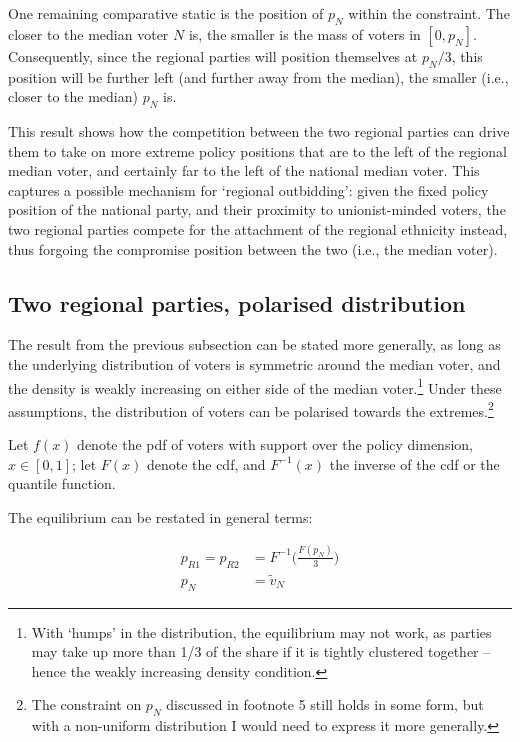 \documentclass[11pt]{article}
\begin{document}
One remaining comparative static is the position of $p_N$ within the constraint. The closer to the median voter $N$ is, the smaller is the mass of voters in $[0, p_N]$. Consequently, since the regional parties will position themselves at $p_N / 3$, this position will be further left (and further away from the median), the smaller (i.e., closer to the median) $p_N$ is.

This result shows how the competition between the two regional parties can drive them to take on more extreme policy positions that are to the left of the regional median voter, and certainly far to the left of the national median voter. This captures a possible mechanism for `regional outbidding': given the fixed policy position of the national party, and their proximity to unionist-minded voters, the two regional parties compete for the attachment of the regional ethnicity instead, thus forgoing the compromise position between the two (i.e., the median voter).

\subsection{Two regional parties, polarised distribution}

The result from the previous subsection can be stated more generally, as long as the underlying distribution of voters is symmetric around the median voter, and the density is weakly increasing on either side of the median voter.\footnote{With `humps' in the distribution, the equilibrium may not work, as parties may take up more than 1/3 of the share if it is tightly clustered together -- hence the weakly increasing density condition.} Under these assumptions, the distribution of voters can be polarised towards the extremes.\footnote{The constraint on $p_N$ discussed in footnote 5 still holds in some form, but with a non-uniform distribution I would need to express it more generally.}

Let $f(x)$ denote the pdf of voters with support over the policy dimension, $x \in [0, 1]$; let $F(x)$ denote the cdf, and $F^{-1}(x)$ the inverse of the cdf or the quantile function.

The equilibrium can be restated in general terms:

\begin{align*}
    p_{R1} = p_{R2} & = F^{-1}\Big(\frac{F(p_N)}{3}\Big) \\
    p_N & = \tilde{v}_N
\end{align*}
\end{document}
